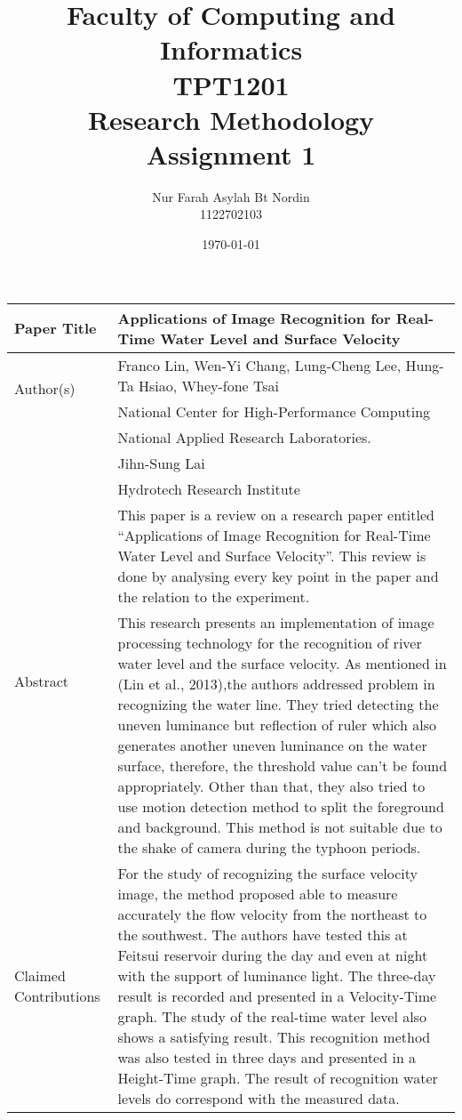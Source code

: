 \documentclass[10pt,a4paper,openany]{report}
\title{Faculty of Computing and Informatics\\
TPT1201\\
Research Methodology\\
Assignment 1\\}
\author{ Nur Farah Asylah Bt Nordin \\
1122702103 \\}
\date{\today}
\begin{document}
\maketitle
\pagebreak 

{\renewcommand{\arraystretch}{1.5}
\hspace*{-2cm}
\begin{tabular}{ |p{2.2cm}| p{13cm}| }
\hline
Paper Title & Applications of Image Recognition for 			Real-Time Water Level and Surface Velocity\\
\hline
\multirow{2}{*}{Author(s)} & Franco Lin, Wen-Yi Chang, Lung-Cheng 		  	Lee, Hung-Ta Hsiao, Whey-fone Tsai \\
& National Center for High-Performance Computing \\
& National Applied Research Laboratories. \\
& Jihn-Sung Lai \\
& Hydrotech Research Institute \\
\hline
\multirow{2}{*}{Abstract}  & This paper is a review on a research paper entitled “Applications of Image Recognition for Real-Time Water Level and Surface Velocity”. This review is done by analysing every key point in the paper and the relation to the experiment.  \\
\hline
\pagebreak
Problem Solved &This research presents an implementation of image processing technology for the recognition of river water level and the surface velocity. As mentioned in (Lin et al., 2013),the authors addressed problem in recognizing the water line. They tried detecting the uneven luminance but reflection of ruler which also generates another uneven luminance on the water surface, therefore, the threshold value can’t be found appropriately. Other than that, they also tried to use motion detection method to split the foreground and background. This method is not suitable due to the shake of camera during the typhoon periods.
 \\
\hline
Claimed Contributions & For the study of recognizing the surface velocity image, the method proposed able to measure accurately the flow velocity from the northeast to the southwest. The authors have tested this at Feitsui reservoir during the day and even at night with the support of luminance light. The three-day result is recorded and presented in a Velocity-Time graph. The study of the real-time water level also shows a satisfying result. This recognition method was also tested in three days and presented in a Height-Time graph. The result of recognition water levels do correspond with the measured data.\\

\end{tabular}}
\end{document}
